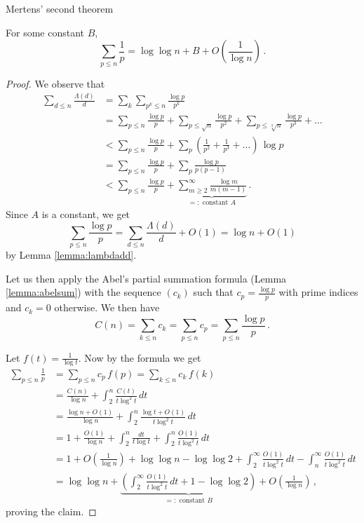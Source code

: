 \documentclass{article}
\begin{document}
\begin{theorem}
Mertens' second theorem \emph{\cite{Goldmakher}}
\label{thm:mertens32}

For some constant $B$,
\begin{equation*}
    \sum_{p\leq n}\frac{1}{p} = \log\log n + B + O\left(\frac{1}{\log n}\right)\,.
\end{equation*}

\begin{proof}
We observe that
\begin{align*}
    \sum_{d\leq n} \frac{\Lambda(d)}{d} & = \sum_k \sum_{p^k\leq n} \frac{\log p}{p^k}\\
    & = \sum_{p\leq n} \frac{\log p}{p} + \sum_{p\leq \sqrt{n}} \frac{\log p}{p^2} + \sum_{p\leq \sqrt[3]{n}} \frac{\log p}{p^3} + \dots\\
    & < \sum_{p\leq n} \frac{\log p}{p} + \sum_p \left(\frac{1}{p^2}+\frac{1}{p^3}+\dots\right)\,\log p\\
    & = \sum_{p\leq n} \frac{\log p}{p} + \sum_p \frac{\log p}{p(p-1)}\\
    & < \sum_{p\leq n} \frac{\log p}{p} + \underbrace{ \sum_{m\geq2}^\infty \frac{\log m}{m(m-1)}}_\text{$=:$ constant $A$}\,.
\end{align*}
Since $A$ is a constant, we get
\begin{equation*}
    \sum_{p\leq n} \frac{\log p}{p} = \sum_{d\leq n} \frac{\Lambda(d)}{d} + O(1) = \log n + O(1)
\end{equation*}
by Lemma \ref{lemma:lambdadd}.

Let us then apply the Abel's partial summation formula (Lemma \ref{lemma:abelsum}) with the sequence $(c_k)$ such that $c_p=\frac{\log p}{p}$ with prime indices and $c_k=0$ otherwise. We then have
\begin{equation*}
    C(n) = \sum_{k\leq n} c_k = \sum_{p\leq n} c_p = \sum_{p\leq n} \frac{\log p}{p}\,.
\end{equation*}

Let $f(t)=\frac{1}{\log t}$. Now by the formula we get
\begin{align*}
    \sum_{p\leq n} \frac{1}{p} & = \sum_{p\leq n} c_p\,f(p) = \sum_{k\leq n} c_k\,f(k)\\
    & = \frac{C(n)}{\log n} + \int_2^n \frac{C(t)}{t\log^2 t}\,dt\\
    & = \frac{\log n + O(1)}{\log n} + \int_2^n \frac{\log t + O(1)}{t\log^2 t}\,dt\\
    & = 1 + \frac{O(1)}{\log n} + \int_2^n \frac{dt}{t \log t} + \int_2^n \frac{O(1)}{t \log^2 t}\,dt\\
    & = 1 + O\left(\frac{1}{\log n}\right) + \log\log n - \log\log 2 + \int_2^\infty \frac{O(1)}{t \log^2 t}\,dt - \int_n^\infty \frac{O(1)}{t \log^2 t}\,dt\\
    & = \log\log n + \underbrace{\left(\int_2^\infty \frac{O(1)}{t \log^2 t}\,dt + 1 - \log \log 2\right)}_\text{$=:$ constant $B$} + O\left(\frac{1}{\log n}\right)\,,
\end{align*}
proving the claim.


\end{proof}
\end{theorem}
\end{document}
